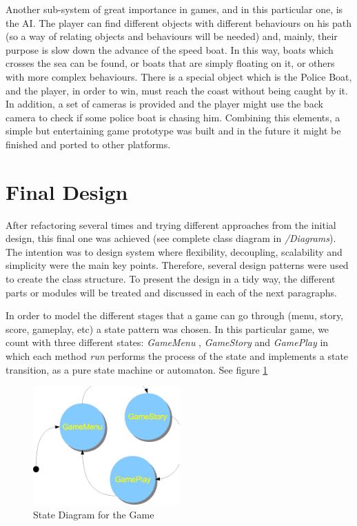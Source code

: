 \documentclass[]{article}
\begin{document}
Another sub-system of great importance in games, and in this particular one, is the AI. The player can find different objects with different behaviours on his path (so a way of relating objects and behaviours will
be needed) and, mainly, their purpose is slow down the advance of the speed boat. In this way, boats which crosses the sea can be found, or boats that are simply floating on it, or others with more complex behaviours. There is
a special object which is the Police Boat, and the player, in order to win, must reach the coast without being caught by it. In addition, a set of cameras is provided and the player might use the back
camera to check if some police boat is chasing him. Combining this elements, a simple but entertaining game prototype was built and in the future it might be finished and ported to other platforms.

 

\section{Final Design}

After refactoring several times and trying different approaches from the initial design, this final one was achieved (see complete class diagram in \emph{/Diagrams}). The intention was to design
system where flexibility, decoupling, scalability and simplicity were the main key points. Therefore, several design patterns were used to create the class structure. To present the design in a tidy way, the different
parts or modules will be treated and discussed in each of the next paragraphs.

In order to model the different stages that a game can go through (menu, story, score, gameplay, etc) a state pattern was chosen. In this particular game, we count with three different states: \emph{GameMenu },
\emph{GameStory} and \emph{GamePlay} in which each method \emph{run} performs the process of the state and implements a state transition, as a pure state machine or automaton. See figure \ref{fig:stateDiagram}

\begin{figure}[!htb]
\begin{center}
\includegraphics[width=0.5\textwidth]{images/stateDiagram.eps}
\caption{State Diagram for the Game}
\label{fig:stateDiagram}
\end{center}
\end{figure}
\end{document}
